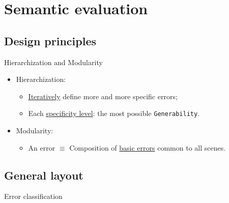 \documentclass[12pt]{beamer}
\begin{document}
    \section{Semantic evaluation}
        \subsection{Design principles}
            \begin{frame}{Hierarchization and Modularity}
                \begin{itemize}[label=\(\blacktriangleright\), font=\color{IGNGreen}, itemsep=2em]
                    \item<1-> Hierarchization:
                        \begin{itemize}[label=\(\blacktriangleright\), font=\color{IGNGreen}, itemsep=2em]
                            \item<2-> \underline{Iteratively} define more and more specific errors;
                            \item<3-> Each \underline{specificity level}: the most possible \texttt{Generability}.
                        \end{itemize}
                    \item<4-> Modularity:
                        \begin{itemize}[label=\(\blacktriangleright\), font=\color{IGNGreen}, itemsep=2em]
                            \item<5-> An error \(\equiv\) Composition of \underline{basic errors} common to all scenes.
                        \end{itemize}
                \end{itemize}
            \end{frame}
        
        \subsection{General layout}
            \begin{frame}{Error classification}
                
            \end{frame}
\end{document}
